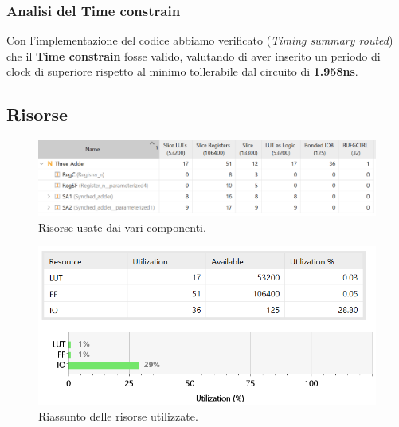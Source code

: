 \documentclass[12pt]{article}
\begin{document}
        \subsubsection{Analisi del Time constrain}
            Con l'implementazione del codice abbiamo verificato (\textit{Timing summary routed}) che il \textbf{Time constrain} fosse valido, valutando di aver inserito un periodo di clock di superiore rispetto al minimo tollerabile dal circuito di \textbf{1.958ns}.
            \newpage

        \subsection{Risorse}
            \begin{figure}[ht]
                \centering
                \includegraphics[scale=0.8]{Risorse_1.png}
                \caption{Risorse usate dai vari componenti.}
            \end{figure}

            \begin{figure}[ht]
                \centering
                \includegraphics[scale=0.8]{Risorse_2.png}
                \caption{Riassunto delle risorse utilizzate.}
            \end{figure}
            \newpage
\end{document}
